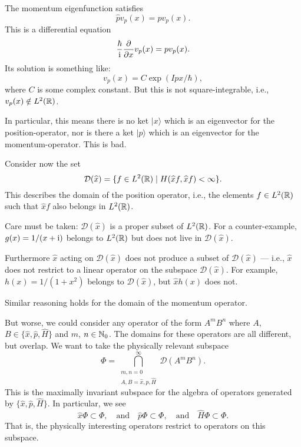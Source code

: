 The momentum eigenfunction satisfies
\begin{equation}
\widehat{p}v_{p}(x) = pv_{p}(x).
\end{equation}
This is a differential equation
\begin{equation}
\frac{\hbar}{\mathrm{i}}\frac{\partial}{\partial x}v_{p}(x) = pv_{p}(x).
\end{equation}
Its solution is something like:
\begin{equation}
v_{p}(x) = C\exp(I px/\hbar),
\end{equation}
where $C$ is some complex constant. But this is not square-integrable,
i.e., $v_{p}(x)\notin L^{2}(\mathbb{R})$.

In particular, this means there is no ket $|x\rangle$ which is an
eigenvector for the position-operator, nor is there a ket $|p\rangle$
which is an eigenvector for the momentum-operator. This is bad.

Consider now the set
\begin{equation}
\mathcal{D}(\widehat{x}) = \{f\in L^{2}(\mathbb{R})\mid H(\widehat{x}f,\widehat{x}f)<\infty\}.
\end{equation}
This describes the domain of the position operator, i.e., the elements
$f\in L^{2}(\mathbb{R})$ such that $\widehat{x}f$ also belongs in $L^{2}(\mathbb{R})$.

Care must be taken: $\mathcal{D}(\widehat{x})$ is a proper subset of
$L^{2}(\mathbb{R})$. For a counter-example, $g(x)=1/(x+\mathrm{i})$ belongs to
$L^{2}(\mathbb{R})$ but does not live in $\mathcal{D}(\widehat{x})$.

Furthermore $\widehat{x}$ acting on
$\mathcal{D}(\widehat{x})$ does not produce a subset of
$\mathcal{D}(\widehat{x})$ --- i.e., $\widehat{x}$ does not restrict to
a linear operator on the subspace $\mathcal{D}(\widehat{x})$.
For example, $h(x)=1/(1+x^{2})$ belongs to $\mathcal{D}(\widehat{x})$,
but $\widehat{x}h(x)$ does not.

Similar reasoning holds for the domain of the momentum operator.

But worse, we could consider any operator of the form $A^{m}B^{n}$ where
$A$, $B\in\{\widehat{x},\widehat{p},\widehat{H}\}$ and $m$, $n\in\mathbb{N}_{0}$.
The domains for these operators are all different, but overlap. We want
to take the physically relevant subspace
\begin{equation}
\Phi = \bigcap^{\infty}_{\substack{m,n=0\\ A,B=\widehat{x},\widehat{p},\widehat{H}}}\mathcal{D}(A^{m}B^{n}).
\end{equation}
This is the maximally invariant subspace for the algebra of operators
generated by $\{\widehat{x},\widehat{p},\widehat{H}\}$. In particular,
we see
\begin{equation}
\widehat{x}\Phi\subset\Phi,\quad\mbox{and}\quad
\widehat{p}\Phi\subset\Phi,\quad\mbox{and}\quad
\widehat{H}\Phi\subset\Phi.
\end{equation}
That is, the physically interesting operators restrict to operators on
this subspace.

